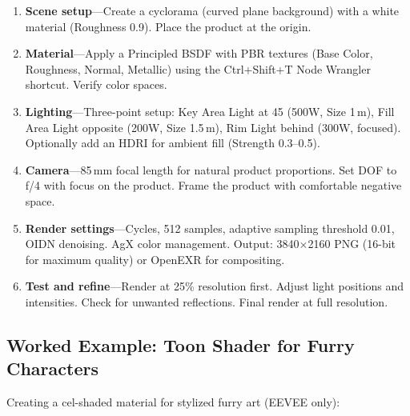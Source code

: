 \begin{enumerate}[leftmargin=2em]
  \item \textbf{Scene setup}---Create a cyclorama (curved plane
        background) with a white material (Roughness 0.9). Place the
        product at the origin.
  \item \textbf{Material}---Apply a Principled BSDF with PBR textures
        (Base Color, Roughness, Normal, Metallic) using the
        Ctrl+Shift+T Node Wrangler shortcut. Verify color spaces.
  \item \textbf{Lighting}---Three-point setup: Key Area Light at
        45\textdegree{} (500W, Size 1\,m), Fill Area Light opposite
        (200W, Size 1.5\,m), Rim Light behind (300W, focused).
        Optionally add an HDRI for ambient fill (Strength 0.3--0.5).
  \item \textbf{Camera}---85\,mm focal length for natural product
        proportions. Set DOF to f/4 with focus on the product.
        Frame the product with comfortable negative space.
  \item \textbf{Render settings}---Cycles, 512 samples, adaptive
        sampling threshold 0.01, OIDN denoising. AgX color
        management. Output: 3840$\times$2160 PNG (16-bit for maximum
        quality) or OpenEXR for compositing.
  \item \textbf{Test and refine}---Render at 25\% resolution first.
        Adjust light positions and intensities. Check for unwanted
        reflections. Final render at full resolution.
\end{enumerate}

\subsection{Worked Example: Toon Shader for Furry Characters}

Creating a cel-shaded material for stylized furry art (EEVEE only):

